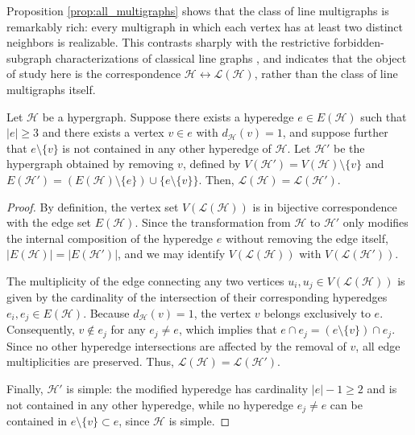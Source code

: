 \documentclass[12pt,reqno]{amsart}
\begin{document}
\begin{remark}
Proposition \ref{prop:all_multigraphs} shows that the class of line multigraphs is remarkably rich: every multigraph in which each vertex has at least two distinct neighbors is realizable. This contrasts sharply with the restrictive forbidden-subgraph characterizations of classical line graphs \cite{line-1}, and indicates that the object of study here is the correspondence $\mathcal{H} \leftrightarrow \mathcal{L}(\mathcal{H})$, rather than the class of line multigraphs itself.
\end{remark}


\begin{lemma}\label{lem:remove-vertex}
Let $\mathcal{H}$ be a hypergraph. Suppose there exists a hyperedge $e \in E(\mathcal{H})$ such that $|e| \geq 3$ and there exists a vertex $v \in e$ with $d_{\mathcal{H}}(v) = 1$, and suppose further that $e \setminus \{v\}$ is not contained in any other hyperedge of $\mathcal{H}$. Let $\mathcal{H}'$ be the hypergraph obtained by removing $v$, defined by $V(\mathcal{H}') = V(\mathcal{H}) \setminus \{v\}$ and $E(\mathcal{H}') = (E(\mathcal{H}) \setminus \{e\}) \cup \{e \setminus \{v\}\}$. Then, $\mathcal{L}(\mathcal{H}) = \mathcal{L}(\mathcal{H}')$.
\end{lemma}

\begin{proof}
By definition, the vertex set $V(\mathcal{L}(\mathcal{H}))$ is in bijective correspondence with the edge set $E(\mathcal{H})$. Since the transformation from $\mathcal{H}$ to $\mathcal{H}'$ only modifies the internal composition of the hyperedge $e$ without removing the edge itself, $|E(\mathcal{H})| = |E(\mathcal{H}')|$, and we may identify $V(\mathcal{L}(\mathcal{H}))$ with $V(\mathcal{L}(\mathcal{H}'))$.

The multiplicity of the edge connecting any two vertices $u_i, u_j \in V(\mathcal{L}(\mathcal{H}))$ is given by the cardinality of the intersection of their corresponding hyperedges $e_i, e_j \in E(\mathcal{H})$. Because $d_{\mathcal{H}}(v) = 1$, the vertex $v$ belongs exclusively to $e$. Consequently, $v \notin e_j$ for any $e_j \neq e$, which implies that $e \cap e_j = (e \setminus \{v\}) \cap e_j$. Since no other hyperedge intersections are affected by the removal of $v$, all edge multiplicities are preserved. Thus, $\mathcal{L}(\mathcal{H}) = \mathcal{L}(\mathcal{H}')$.

Finally, $\mathcal{H}'$ is simple: the modified hyperedge has cardinality $|e| - 1 \geq 2$ and is not contained in any other hyperedge, while no hyperedge $e_j \neq e$ can be contained in $e \setminus \{v\} \subset e$, since $\mathcal{H}$ is simple.
\end{proof}
\end{document}
